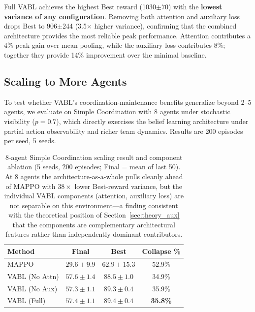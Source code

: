 \documentclass{article}
\theoremstyle{plain}
\theoremstyle{definition}
\theoremstyle{remark}
\begin{document}
Full VABL achieves the highest Best reward (1030$\pm$70) with the \textbf{lowest variance of any configuration}. Removing both attention and auxiliary loss drops Best to 906$\pm$244 (3.5$\times$ higher variance), confirming that the combined architecture provides the most reliable peak performance. Attention contributes a 4\% peak gain over mean pooling, while the auxiliary loss contributes 8\%; together they provide 14\% improvement over the minimal baseline.

\subsection{Scaling to More Agents}
\label{sec:scaling}

To test whether VABL's coordination-maintenance benefits generalize beyond 2--5 agents, we evaluate on Simple Coordination with 8 agents under stochastic visibility ($p=0.7$), which directly exercises the belief learning architecture under partial action observability and richer team dynamics. Results are 200 episodes per seed, 5 seeds.

\begin{table}[tb]
\centering
\caption{8-agent Simple Coordination scaling result and component ablation (5 seeds, 200 episodes; Final = mean of last 50). At 8 agents the architecture-as-a-whole pulls cleanly ahead of MAPPO with $38\times$ lower Best-reward variance, but the individual VABL components (attention, auxiliary loss) are not separable on this environment---a finding consistent with the theoretical position of Section~\ref{sec:theory_aux} that the components are complementary architectural features rather than independently dominant contributors.}
\label{tab:scaling_8agent}
\begingroup
\setlength{\tabcolsep}{4pt}
\renewcommand{\arraystretch}{0.95}
\small
\begin{tabular}{lccc}
\toprule
\textbf{Method} & \textbf{Final} & \textbf{Best} & \textbf{Collapse \%} \\
\midrule
MAPPO & $29.6 \pm 9.9$ & $62.9 \pm 15.3$ & 52.9\% \\
VABL (No Attn) & $57.6 \pm 1.4$ & $88.5 \pm 1.0$ & 34.9\% \\
VABL (No Aux) & $57.3 \pm 1.1$ & $89.3 \pm 0.4$ & 35.9\% \\
VABL (Full) & $\mathbf{57.4 \pm 1.1}$ & $\mathbf{89.4 \pm 0.4}$ & \textbf{35.8\%} \\
\bottomrule
\end{tabular}
\endgroup
\end{table}
\end{document}
